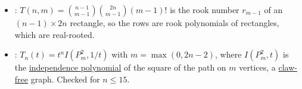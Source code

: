 \begin{itemize}
\item {}: $T(n,m)=\binom{n-1}{m-1}\binom{2n}{m-1}(m-1)!$ is the rook
number $r_{m-1}$ of an $(n-1)\times 2n$ rectangle, so the rows are rook
polynomials of rectangles, which are real-rooted.

\item {}: $T_n(t)=t^nI(P_m^2,1/t)$ with $m=\max(0,2n-2)$, where
$I(P_m^2,t)$ is the \hyperref[independencePolynomial]{independence polynomial}
of the square of the path on $m$ vertices, a
\hyperref[clawFreeGraph]{claw-free} graph.  Checked for $n\leq 15$.
\end{itemize}
